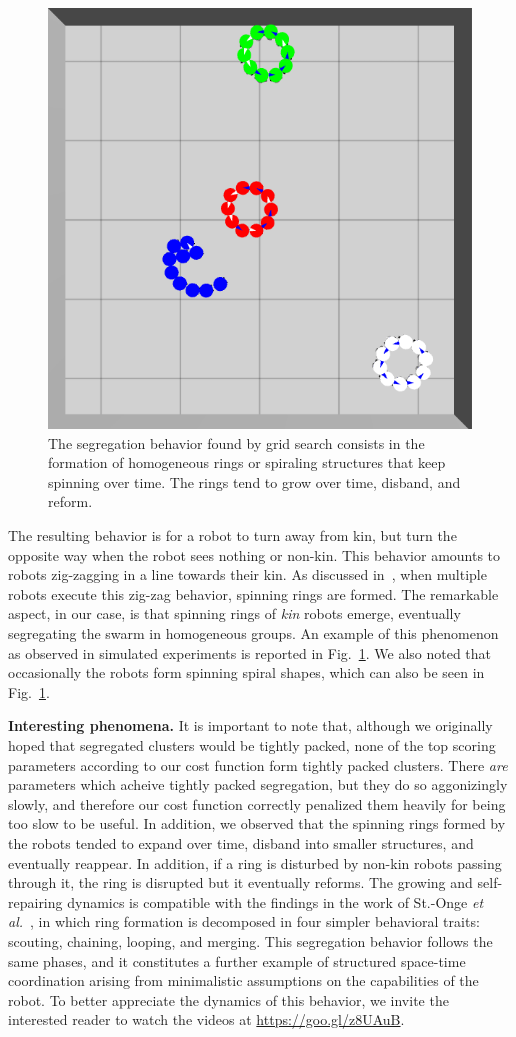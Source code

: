 \documentclass[letterpaper, 10 pt, conference]{ieeeconf}
\newcommand{\myparagraph}[1]{\textbf{#1.}}
\begin{document}
\begin{figure}[t]
  \centering
  \includegraphics[width=0.5\linewidth]{./images/rings_example.png}
  \caption{The segregation behavior found by grid search consists in the
    formation of homogeneous rings or spiraling structures that keep spinning
    over time. The rings tend to grow over time, disband, and reform.}
  \label{fig:rings}
\end{figure}
The resulting behavior is for a robot to turn away from kin, but turn the
opposite way when the robot sees nothing or non-kin. This behavior amounts to
robots zig-zagging in a line towards their kin. As discussed
in~\cite{StOnge:IROS2018}, when multiple robots execute this zig-zag behavior,
spinning rings are formed. The remarkable aspect, in our case, is that spinning
rings of \emph{kin} robots emerge, eventually segregating the swarm in
homogeneous groups. An example of this phenomenon as observed in simulated
experiments is reported in Fig.~\ref{fig:rings}. We also noted that occasionally the
robots form spinning spiral shapes, which can also be seen in
Fig.~\ref{fig:rings}.

\myparagraph{Interesting phenomena}
It is important to note that, although we originally hoped that segregated
clusters would be tightly packed, none of the top scoring parameters according to our cost
function form tightly packed clusters. There \emph{are} parameters
which acheive tightly packed segregation, but they do so aggonizingly slowly,
and therefore our cost function correctly penalized them heavily for being too slow
to be useful. In addition, we observed that the spinning rings formed by the robots tended to expand over
time, disband into smaller structures, and eventually reappear. In addition, if
a ring is disturbed by non-kin robots passing through it, the ring is disrupted
but it eventually reforms. The growing and self-repairing dynamics is compatible
with the findings in the work of St.-Onge \emph{et al.}~\cite{StOnge:IROS2018},
in which ring formation is decomposed in four simpler behavioral traits:
scouting, chaining, looping, and merging. This segregation behavior follows the
same phases, and it constitutes a further example of structured space-time
coordination arising from minimalistic assumptions on the capabilities of the
robot. To better appreciate the dynamics of this behavior, we invite the
interested reader to watch the videos at
\href{https://www.youtube.com/playlist?list=PL9HqYJ1IkIKVX9EsT5BY9LnBsBPTjc5bB}{https://goo.gl/z8UAuB}.
\end{document}
